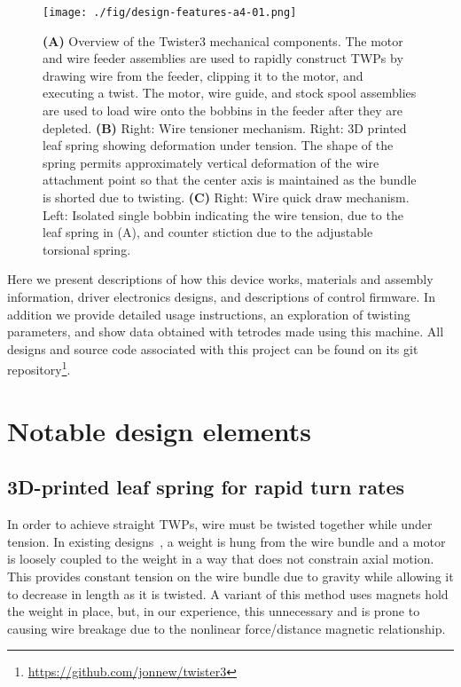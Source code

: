 \documentclass[11pt,a4paper]{article}
\begin{document}
\begin{figure}
\centering \texttt{[image: ./fig/design-features-a4-01.png]}
\caption{\textbf{(A)} Overview of the Twister3 mechanical components. The
    motor and wire feeder assemblies are used to rapidly construct TWPs by
    drawing wire from the feeder, clipping it to the motor, and executing a
    twist. The motor, wire guide, and stock spool assemblies are used to
    load wire onto the bobbins in the feeder after they are depleted.
    \textbf{(B)} Right: Wire tensioner mechanism. Right: 3D printed
    leaf spring showing deformation under tension. The shape of the spring
    permits approximately vertical deformation of the wire attachment point
    so that the center axis is maintained as the bundle is shorted due to
    twisting. \textbf{(C)} Right: Wire quick draw mechanism. Left: Isolated
    single bobbin indicating the wire tension, due to the leaf spring in (A),
    and counter stiction due to the adjustable torsional spring.}
\label{f:design-features}
\end{figure}

Here we present descriptions of how this device works, materials and assembly
information, driver electronics designs, and descriptions of control firmware.
In addition we provide detailed usage instructions, an exploration of twisting
parameters, and show data obtained with tetrodes made using this machine. All
designs and source code associated with this project can be found on its git
repository\footnote{\url{https://github.com/jonnew/twister3}}.

\section{Notable design elements}

\subsection{3D-printed leaf spring for rapid turn rates}
In order to achieve straight TWPs, wire must be twisted together while under
tension. In existing designs~\cite{}, a weight is hung from the wire bundle and
a motor is loosely coupled to the weight in a way that does not constrain axial
motion. This provides constant tension on the wire bundle due to gravity while
allowing it to decrease in length as it is twisted. A variant of this method
uses magnets hold the weight in place, but, in our experience, this unnecessary
and is prone to causing wire breakage due to the nonlinear force/distance
magnetic relationship.
\end{document}
